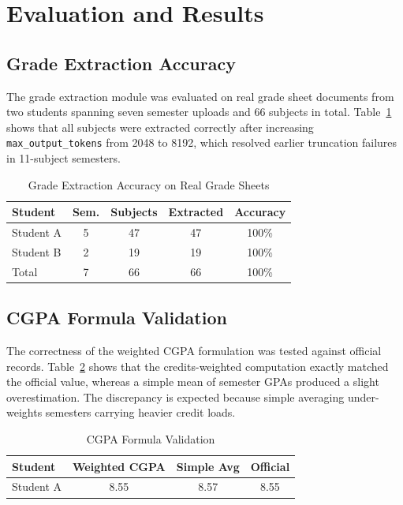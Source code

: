 \documentclass[conference]{IEEEtran}
\begin{document}
\section{Evaluation and Results}
\subsection{Grade Extraction Accuracy}
The grade extraction module was evaluated on real grade sheet documents from two students spanning seven semester uploads and 66 subjects in total. Table~\ref{tab:extraction} shows that all subjects were extracted correctly after increasing \texttt{max\_output\_tokens} from 2048 to 8192, which resolved earlier truncation failures in 11-subject semesters.

\begin{table}[t]
\caption{Grade Extraction Accuracy on Real Grade Sheets}
\label{tab:extraction}
\centering
\begin{tabular}{lcccc}
\toprule
Student & Sem. & Subjects & Extracted & Accuracy \\
\midrule
Student A & 5 & 47 & 47 & 100\% \\
Student B & 2 & 19 & 19 & 100\% \\
Total & 7 & 66 & 66 & 100\% \\
\bottomrule
\end{tabular}
\end{table}

\subsection{CGPA Formula Validation}
The correctness of the weighted CGPA formulation was tested against official records. Table~\ref{tab:cgpa-validation} shows that the credits-weighted computation exactly matched the official value, whereas a simple mean of semester GPAs produced a slight overestimation. The discrepancy is expected because simple averaging under-weights semesters carrying heavier credit loads.

\begin{table}[t]
\caption{CGPA Formula Validation}
\label{tab:cgpa-validation}
\centering
\begin{tabular}{lccc}
\toprule
Student & Weighted CGPA & Simple Avg & Official \\
\midrule
Student A & 8.55 & 8.57 & 8.55 \\
\bottomrule
\end{tabular}
\end{table}
\end{document}
